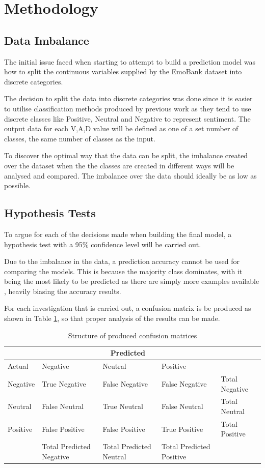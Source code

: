    
\section{Methodology}
\subsection{Data Imbalance}

The initial issue faced when starting to attempt to build a prediction model was how to split the continuous variables supplied by the EmoBank dataset into discrete categories.

The decision to split the data into discrete categories was done since it is easier to utilise classification methods produced by previous work as they tend to use discrete classes like Positive, Neutral and Negative to represent sentiment. The output data for each V,A,D value will be defined as one of a set number of classes, the same number of classes as the input.

To discover the optimal way that the data can be split, the imbalance created over the dataset when the the classes are created in different ways will be analysed and compared. The imbalance over the data should ideally be as low as possible.

\subsection{Hypothesis Tests}

To argue for each of the decisions made when building the final model, a hypothesis test with a 95\% confidence level will be carried out.

Due to the imbalance in the data, a prediction accuracy cannot be used for comparing the models. This is because the majority class dominates, with it being the most likely to be predicted as there are simply more examples available \cite{al2015applied}, heavily biasing the accuracy results.

For each investigation that is carried out, a confusion matrix is be produced as shown in Table \ref{conmat}, so that proper analysis of the results can be made.

\begin{table}
\centering
\begin{tabular}{|p{3cm}|p{3cm}|p{3cm}|p{3cm}|p{3cm}|}
 \hline
  & \multicolumn{3}{|c|}{Predicted} & \\
 \hline
   Actual & Negative & Neutral & Positive & \\
    \hline
    Negative &  True Negative   &  False Negative  & False Negative & Total Negative \\
    Neutral & False Neutral & True Neutral&  False Neutral & Total Neutral \\
    Positive & False Positive & False Positive &  True Positive & Total Positive \\
    \hline
    & Total Predicted Negative & Total Predicted Neutral & Total Predicted Positive & \\
 \hline
\end{tabular}
\caption{Structure of produced confusion matrices}
\label{conmat}
\end{table}

